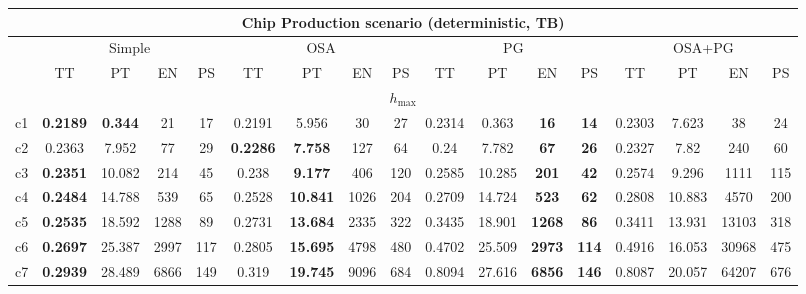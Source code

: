 \documentclass[landscape]{article}%
\begin{document}
%
\normalsize%
\begin{tabular}{||c||c|c|c|c|c|c|c|c|c|c|c|c|c|c|c|c||}%
\multicolumn{17}{c}{\textbf{Chip Production scenario (deterministic, TB)}}\\%
\hline%
&\multicolumn{4}{|c|}{\small{Simple}}&\multicolumn{4}{|c|}{\small{OSA}}&\multicolumn{4}{|c|}{\small{PG}}&\multicolumn{4}{|c|}{\small{OSA+PG}}\\%
\hline%
&\small{TT}&\small{PT}&\small{EN}&\small{PS}&\small{TT}&\small{PT}&\small{EN}&\small{PS}&\small{TT}&\small{PT}&\small{EN}&\small{PS}&\small{TT}&\small{PT}&\small{EN}&\small{PS}\\%
\hline%
\multicolumn{17}{||c||}{$h_{\max}$}\\%
\hline%
c1&\small{\textbf{0.2189}}&\small{\textbf{0.344}}&\small{21}&\small{17}&\small{0.2191}&\small{5.956}&\small{30}&\small{27}&\small{0.2314}&\small{0.363}&\small{\textbf{16}}&\small{\textbf{14}}&\small{0.2303}&\small{7.623}&\small{38}&\small{24}\\%
\hline%
c2&\small{0.2363}&\small{7.952}&\small{77}&\small{29}&\small{\textbf{0.2286}}&\small{\textbf{7.758}}&\small{127}&\small{64}&\small{0.24}&\small{7.782}&\small{\textbf{67}}&\small{\textbf{26}}&\small{0.2327}&\small{7.82}&\small{240}&\small{60}\\%
\hline%
c3&\small{\textbf{0.2351}}&\small{10.082}&\small{214}&\small{45}&\small{0.238}&\small{\textbf{9.177}}&\small{406}&\small{120}&\small{0.2585}&\small{10.285}&\small{\textbf{201}}&\small{\textbf{42}}&\small{0.2574}&\small{9.296}&\small{1111}&\small{115}\\%
\hline%
c4&\small{\textbf{0.2484}}&\small{14.788}&\small{539}&\small{65}&\small{0.2528}&\small{\textbf{10.841}}&\small{1026}&\small{204}&\small{0.2709}&\small{14.724}&\small{\textbf{523}}&\small{\textbf{62}}&\small{0.2808}&\small{10.883}&\small{4570}&\small{200}\\%
\hline%
c5&\small{\textbf{0.2535}}&\small{18.592}&\small{1288}&\small{89}&\small{0.2731}&\small{\textbf{13.684}}&\small{2335}&\small{322}&\small{0.3435}&\small{18.901}&\small{\textbf{1268}}&\small{\textbf{86}}&\small{0.3411}&\small{13.931}&\small{13103}&\small{318}\\%
\hline%
c6&\small{\textbf{0.2697}}&\small{25.387}&\small{2997}&\small{117}&\small{0.2805}&\small{\textbf{15.695}}&\small{4798}&\small{480}&\small{0.4702}&\small{25.509}&\small{\textbf{2973}}&\small{\textbf{114}}&\small{0.4916}&\small{16.053}&\small{30968}&\small{475}\\%
\hline%
c7&\small{\textbf{0.2939}}&\small{28.489}&\small{6866}&\small{149}&\small{0.319}&\small{\textbf{19.745}}&\small{9096}&\small{684}&\small{0.8094}&\small{27.616}&\small{\textbf{6856}}&\small{\textbf{146}}&\small{0.8087}&\small{20.057}&\small{64207}&\small{676}\\%

\end{tabular}
\end{document}
